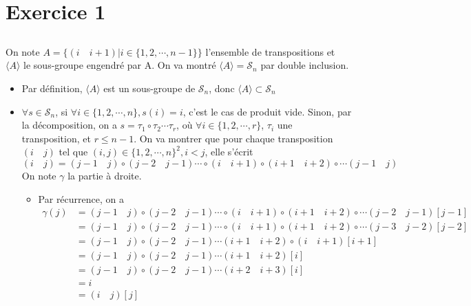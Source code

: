 \documentclass[a4paper,12pt]{book}
\begin{document}
\renewcommand{\labelitemi}{$\blacktriangleright$}
\renewcommand{\labelitemii}{$\bullet$}


\section{Exercice 1}
\subsection{}
On note $A=\{(i \quad i+1)| i \in \{1,2,\cdots,n-1\}\}$ l’ensemble de transpositions et 
$\langle A\rangle$ le sous-groupe engendré par A. On va montré $\langle A\rangle=\mathscr{S}_n$ par double inclusion. 
\begin{itemize}
    \item Par définition, $\langle A\rangle$ est un sous-groupe de $\mathscr{S}_n$, donc $\langle A\rangle \subset \mathscr{S}_n$
    \item $\forall s \in \mathscr{S}_n$, si $\forall i \in \{1,2,\cdots,n\}, s(i)=i$, c'est le cas de produit vide. 
    Sinon, par la décomposition, on a $s=\tau_1 \circ \tau_2 \cdots \tau_r$, où $\forall i \in \{1,2,\cdots,r\}$, $\tau_i$ 
          une transposition, et $r \leq n-1$. On va montrer que pour chaque transposition $(i \quad j)$ tel que $(i,j)\in \{1,2,\cdots,n\}^2, i<j$, elle s'écrit
          $$(i\quad j)=(j-1 \quad j)\circ (j-2 \quad j-1)\cdots\circ (i\quad i+1)\circ (i+1\quad i+2)\circ\cdots(j-1 \quad j)$$
          On note $\gamma$ la partie à droite. 
          \begin{itemize}
              \item Par récurrence, on a 
              \begin{align*}
                \gamma(j)&=(j-1 \quad j)\circ (j-2 \quad j-1)\cdots\circ (i\quad i+1)\circ (i+1\quad i+2)\circ\cdots(j-2 \quad j-1)[j-1]\\
                         &=(j-1 \quad j)\circ (j-2 \quad j-1)\cdots\circ (i\quad i+1)\circ (i+1\quad i+2)\circ\cdots(j-3 \quad j-2)[j-2]\\
                         &=(j-1 \quad j)\circ (j-2 \quad j-1)\cdots(i+1\quad i+2)\circ (i\quad i+1)[i+1]\\
                         &=(j-1 \quad j)\circ (j-2 \quad j-1)\cdots(i+1\quad i+2)[i]\\
                         &=(j-1 \quad j)\circ (j-2 \quad j-1)\cdots(i+2\quad i+3)[i]\\
                         &=i\\
                         &=(i\quad j)[j]

\end{align*}
\end{itemize}
\end{itemize}
\end{document}
